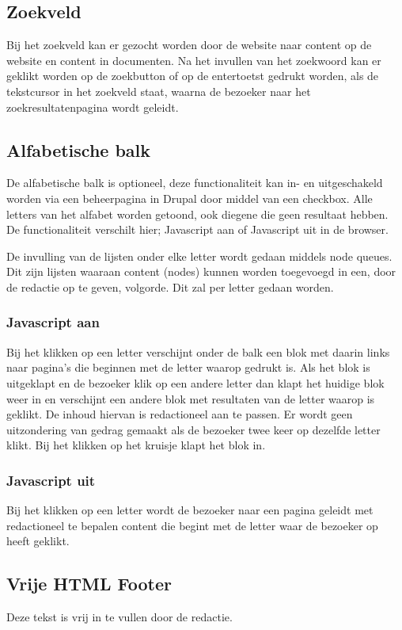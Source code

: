 \subsection{Zoekveld}
\label{sec:zoekveld}
Bij het zoekveld kan er gezocht worden door de website naar content op de website en content in documenten. Na het invullen van het zoekwoord kan er geklikt worden op de zoekbutton of op de entertoetst gedrukt worden, als de tekstcursor in het zoekveld staat, waarna de bezoeker naar het zoekresultatenpagina wordt geleidt. 

\subsection{Alfabetische balk}
\label{sec:alfabetischebalk}
De alfabetische balk is optioneel, deze functionaliteit kan in- en uitgeschakeld worden via een beheerpagina in Drupal door middel van een checkbox. Alle letters van het alfabet worden getoond, ook diegene die geen resultaat hebben. De functionaliteit verschilt hier; Javascript aan of Javascript uit in de browser.

De invulling van de lijsten onder elke letter wordt gedaan middels node queues. Dit zijn lijsten waaraan content (nodes) kunnen worden toegevoegd in een, door de redactie op te geven, volgorde. Dit zal per letter gedaan worden. 

\subsubsection{Javascript aan}
Bij het klikken op een letter verschijnt onder de balk een blok met daarin links naar pagina's die beginnen met de letter waarop gedrukt is. Als het blok is uitgeklapt en de bezoeker klik op een andere letter dan klapt het huidige blok weer in en verschijnt een andere blok met resultaten van de letter waarop is geklikt. De inhoud hiervan is redactioneel aan te passen. Er wordt geen uitzondering van gedrag gemaakt als de bezoeker twee keer op dezelfde letter klikt. Bij het klikken op het kruisje klapt het blok in.

\subsubsection{Javascript uit}
Bij het klikken op een letter wordt de bezoeker naar een pagina geleidt met redactioneel te bepalen content die begint met de letter waar de bezoeker op heeft geklikt.

\subsection{Vrije HTML Footer}
\label{sec:vrijehtmlfooter}
Deze tekst is vrij in te vullen door de redactie.

